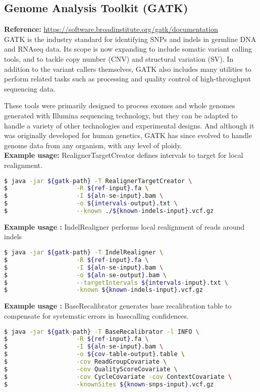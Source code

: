 \documentclass[8pt]{article}
\begin{document}
\subsection*{Genome Analysis Toolkit (GATK)}
\textbf{Reference:} \url{https://software.broadinstitute.org/gatk/documentation}\\
GATK is the industry standard for identifying SNPs and indels in germline DNA and RNAseq data. Its scope is now expanding to include somatic variant calling tools, and to tackle copy number (CNV) and structural variation (SV). In addition to the variant callers themselves, GATK also includes many utilities to perform related tasks such as processing and quality control of high-throughput sequencing data.

These tools were primarily designed to process exomes and whole genomes generated with Illumina sequencing technology, but they can be adapted to handle a variety of other technologies and experimental designs. And although it was originally developed for human genetics, GATK has since evolved to handle genome data from any organism, with any level of ploidy.\\
\textbf{Example usage:} RealignerTargetCreator defines intervals to target for local realignment.
\begin{lstlisting}[language=bash]
$ java -jar ${gatk-path} -T RealignerTargetCreator \
$					-R ${ref-input}.fa \
$					-I ${aln-se-input}.bam \
$					-o ${intervals-output}.txt \
$					--known ./${known-indels-input}.vcf.gz
\end{lstlisting}
\textbf{Example usage :} IndelRealigner performs local realignment of reads around indels
\begin{lstlisting}[language=bash]
$ java -jar ${gatk-path} -T IndelRealigner \
$					-R ${ref-input}.fa \
$					-I ${aln-se-input}.bam \
$					-o ${aln-se-output}.bam \
$					--targetIntervals ${intervals-input}.txt \
$					-known ${known-indels-input}.vcf.gz
\end{lstlisting}
\textbf{Example usage :} BaseRecalibrator generates base recalibration table to compensate for systematic errors in basecalling confidences.
\begin{lstlisting}[language=bash]
$ java -jar ${gatk-path} -T BaseRecalibrator -l INFO \
$					-R ${ref-input}.fa \
$					-I ${aln-se-input}.bam \
$					-o ${cov-table-output}.table \
$					-cov ReadGroupCovariate \
$					-cov QualityScoreCovariate \
$					-cov CycleCovariate -cov ContextCovariate \
$					-knownSites ${known-snps-input}.vcf.gz
\end{lstlisting}
\end{document}
